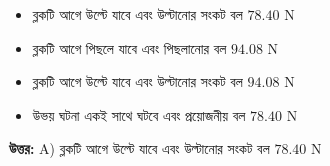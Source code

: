 \documentclass[12pt, a4paper]{article}
\begin{document}
\begin{center}
\end{center}
\vspace{1em}

\begin{itemize}[label={}, leftmargin=1cm, itemsep=0.5em]
\item[\textbf{A)}] ব্লকটি আগে উল্টে যাবে এবং উল্টানোর সংকট বল $78.40\text{ N}$
\item[\textbf{B)}] ব্লকটি আগে পিছলে যাবে এবং পিছলানোর বল $94.08\text{ N}$
\item[\textbf{C)}] ব্লকটি আগে উল্টে যাবে এবং উল্টানোর সংকট বল $94.08\text{ N}$
\item[\textbf{D)}] উভয় ঘটনা একই সাথে ঘটবে এবং প্রয়োজনীয় বল $78.40\text{ N}$
\end{itemize}

\vspace{0.5em}
\begin{tcolorbox}[answerbox]
\textbf{\color{success} উত্তর:} A) ব্লকটি আগে উল্টে যাবে এবং উল্টানোর সংকট বল $78.40\text{ N}$
\end{tcolorbox}
\vspace{1em}
\end{document}
